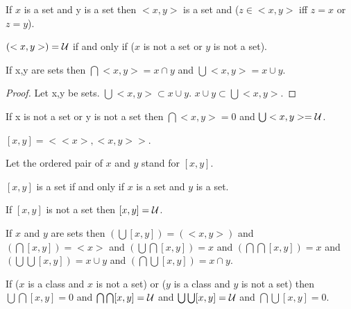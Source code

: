 \documentclass[a4paper,draft]{amsproc}
\begin{document}
\begin{forthel}
\begin{theorem}[46a]
If $x$ is a set and y is a set 
then $<x,y>$ is a set and ($z \in <x,y>$ iff $z=x$ or $z=y$). 
\end{theorem}

\begin{theorem}[46b]
$(<x,y>) = \cal{U}$ if and only if ($x$ is not a set or $y$ is not a set).
\end{theorem}

\begin{theorem}[47a]
If x,y are sets then $\bigcap <x,y> = x \cap y$
and $\bigcup <x,y> = x \cup y$.
\end{theorem}
\begin{proof}
Let x,y be sets.
$\bigcup <x,y> \subset x \cup y$.
$x \cup y \subset \bigcup <x,y>$.
\end{proof}

\begin{theorem}[47b]
If x is not a set or y is not a set then
$\bigcap <x,y> = 0$ and $\bigcup <x,y> = \cal{U}$.
\end{theorem}


\begin{definition}[48] $[x,y] = <<x>,<x,y>>$.\end{definition}
Let the ordered pair of $x$ and $y$ stand for $[x,y]$.

\begin{theorem}[49a]
$[x,y]$ is a set if and only if $x$ is a set and $y$ is a set.
\end{theorem}

\begin{theorem}[49b]
If $[x,y]$ is not a set then $[x,y] = \cal{U}$.
\end{theorem}

\begin{theorem}[50a]
If $x$ and $y$ are sets then 
  $(\bigcup [x,y]) = (<x,y>)$ and
  $(\bigcap [x,y]) = <x>$ and
  $(\bigcup \bigcap [x,y]) = x$ and
  $(\bigcap \bigcap [x,y]) = x$ and
  $(\bigcup \bigcup [x,y]) = x \cup y$ and
  $(\bigcap \bigcup [x,y]) = x \cap y$.
\end{theorem}

\begin{theorem}[50b]
If ($x$ is a class and $x$ is not a set) or ($y$ is a class and $y$ is not a set) then
  $\bigcup \bigcap [x,y] = 0$ and
  $\bigcap \bigcap [x,y] = \cal{U}$ and
  $\bigcup \bigcup [x,y] = \cal{U}$ and
  $\bigcap \bigcup [x,y] = 0$.
\end{theorem}


\end{forthel}
\end{document}
